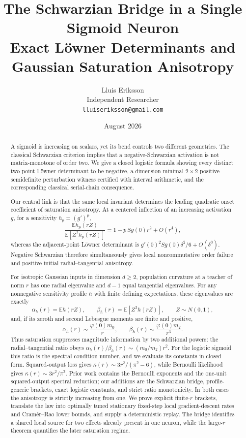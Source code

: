 \documentclass[11pt]{article}
\title{\bfseries The Schwarzian Bridge in a Single Sigmoid Neuron\\
\large Exact L\"owner Determinants and Gaussian Saturation Anisotropy}
\author{Lluis Eriksson\\Independent Researcher\\\texttt{lluiseriksson@gmail.com}}
\date{August 2026}
\newcommand{\E}{\mathbb E}
\begin{document}
\maketitle

\begin{abstract}
A sigmoid is increasing on scalars, yet its bend controls two different geometries.  The classical Schwarzian
criterion implies that a negative-Schwarzian activation is not matrix-monotone of order two.  We give a closed
logistic formula showing every distinct two-point L\"owner determinant to be negative, a dimension-minimal
$2\times2$ positive-semidefinite perturbation witness certified with interval arithmetic, and the corresponding
classical serial-chain consequence.

Our central link is that the same local invariant determines the leading quadratic onset coefficient of saturation
anisotropy.  At a centered
inflection of an increasing activation $g$, for a sensitivity $h_p=(g')^p$,
\[
 \frac{\E h_p(rZ)}{\E[Z^2h_p(rZ)]}=1-p\,Sg(0)r^2+O(r^4),
\]
whereas the adjacent-point L\"owner determinant is
$g'(0)^2Sg(0)\delta^2/6+O(\delta^3)$.  Negative Schwarzian therefore simultaneously gives local
noncommutative order failure and positive initial radial--tangential anisotropy.

For isotropic Gaussian inputs in dimension $d\ge2$, population curvature at a teacher of norm $r$ has one radial eigenvalue and $d-1$ equal
tangential eigenvalues.  For any nonnegative sensitivity profile $h$ with finite defining expectations, these
eigenvalues are exactly
\[
 \alpha_h(r)=\E h(rZ),\qquad \beta_h(r)=\E[Z^2h(rZ)],\qquad Z\sim N(0,1),
\]
and, if its zeroth and second Lebesgue moments are finite and positive,
\[
 \alpha_h(r)\sim \frac{\varphi(0)m_0}{r},\qquad
 \beta_h(r)\sim \frac{\varphi(0)m_2}{r^3}.
\]
Thus saturation suppresses magnitude information by two additional powers: the radial--tangential ratio obeys
$\alpha_h(r)/\beta_h(r)\sim(m_0/m_2)r^2$.  For the logistic sigmoid this ratio is the spectral condition number,
and we evaluate its constants in closed form.  Squared-output
loss gives $\kappa(r)\sim 3r^2/(\pi^2-6)$, while Bernoulli likelihood gives
$\kappa(r)\sim3r^2/\pi^2$.  Prior work contains the Bernoulli exponents and the one-unit squared-output spectral
reduction; our additions are the Schwarzian bridge, profile-generic brackets, exact logistic constants, and strict
ratio monotonicity.  In both cases the anisotropy is strictly increasing from one.  We prove explicit finite-$r$
brackets, translate the law into optimally tuned stationary fixed-step local gradient-descent rates and
Cram\'er--Rao lower bounds, and supply a
deterministic replay.  The bridge identifies a shared local source for two effects already present in one neuron,
while the large-$r$ theorem quantifies the later saturation regime.
\end{abstract}
\end{document}
